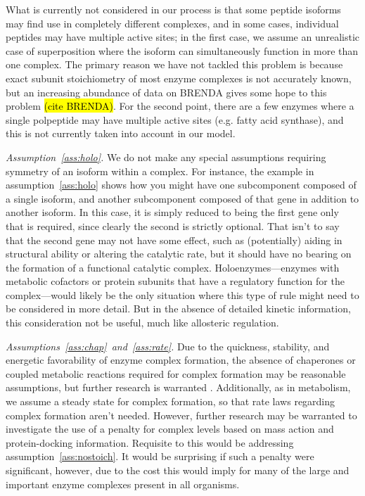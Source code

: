 \documentclass[phd,tocprelim]{cornell}
\theoremstyle{break}
\theoremstyle{empty}
\begin{document}
What is currently not considered in our
process is that some peptide isoforms may find use in completely
different complexes, and in some cases, individual peptides may
have multiple active sites; in the first case, we assume an unrealistic case of
superposition where the isoform can simultaneously function in more
than one complex. The primary reason we have not tackled this problem
is because exact subunit stoichiometry of most enzyme complexes is not
accurately known, but an increasing abundance of data on BRENDA gives
some hope to this problem \hl{(cite BRENDA)}. For the second point, there are a
few enzymes where a single polpeptide may have multiple active sites
(e.g. fatty acid synthase), and this is not currently taken into 
account in our model. 

\emph{Assumption~\ref{ass:holo}.}
We do not make any special assumptions requiring symmetry of an isoform
within a complex. For instance, the example in
assumption~\ref{ass:holo} shows how you might have one
subcomponent composed of a single isoform, and another subcomponent
composed of that gene in addition to another isoform. In this case, it
is simply reduced to being the first gene only that is required, since
clearly the second is strictly optional. That isn't to say that the
second gene may not have some effect, such as (potentially) aiding in
structural ability or altering the catalytic rate, but it should have
no bearing on the formation of a functional catalytic
complex. Holoenzymes---enzymes with metabolic cofactors or protein
subunits that have a regulatory function for the complex---would
likely be the only situation where this type of rule might need to be
considered in more detail. But in the absence of detailed kinetic
information, this consideration not be useful, much like allosteric
regulation.

\emph{Assumptions~\ref{ass:chap}~and~\ref{ass:rate}.}
Due to the quickness, stability, and energetic favorability of enzyme
complex formation, the absence of chaperones or coupled metabolic
reactions required for complex formation may be reasonable
assumptions, but further research is warranted \cite{Karr2012}.
Additionally, as in metabolism, we assume a steady state for complex
formation, so that rate laws regarding complex formation aren't
needed. However, further research may be warranted to investigate the
use of a penalty for complex levels based on mass action and
protein-docking information. Requisite to this would be addressing
assumption~\ref{ass:nostoich}. It would be surprising if such a
penalty were significant, however, due to the cost this would imply
for many of the large and important enzyme complexes present in all
organisms.
\end{document}
